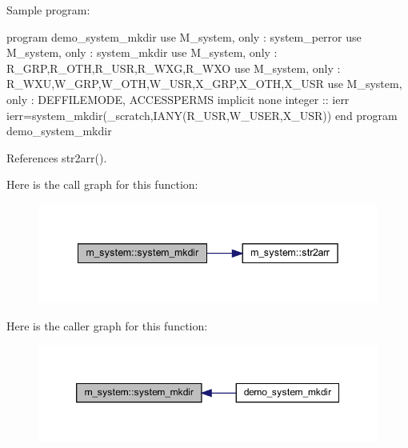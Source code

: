 Sample program\+:

program demo\+\_\+system\+\_\+mkdir use M\+\_\+system, only \+: system\+\_\+perror use M\+\_\+system, only \+: system\+\_\+mkdir use M\+\_\+system, only \+: R\+\_\+\+G\+RP,R\+\_\+\+O\+TH,R\+\_\+\+U\+SR,R\+\_\+\+W\+XG,R\+\_\+\+W\+XO use M\+\_\+system, only \+: R\+\_\+\+W\+XU,W\+\_\+\+G\+RP,W\+\_\+\+O\+TH,W\+\_\+\+U\+SR,X\+\_\+\+G\+RP,X\+\_\+\+O\+TH,X\+\_\+\+U\+SR use M\+\_\+system, only \+: D\+E\+F\+F\+I\+L\+E\+M\+O\+DE, A\+C\+C\+E\+S\+S\+P\+E\+R\+MS implicit none integer \+:\+: ierr ierr=system\+\_\+mkdir(\textquotesingle{}\+\_\+scratch\textquotesingle{},I\+A\+N\+Y(\+R\+\_\+\+U\+S\+R,\+W\+\_\+\+U\+S\+E\+R,\+X\+\_\+\+U\+S\+R)) end program demo\+\_\+system\+\_\+mkdir 

References str2arr().

Here is the call graph for this function\+:
\nopagebreak
\begin{figure}[H]
\begin{center}
\leavevmode
\includegraphics[width=342pt]{namespacem__system_a084d644c236d22af2cc75c6e48fd6e96_cgraph}
\end{center}
\end{figure}
Here is the caller graph for this function\+:
\nopagebreak
\begin{figure}[H]
\begin{center}
\leavevmode
\includegraphics[width=350pt]{namespacem__system_a084d644c236d22af2cc75c6e48fd6e96_icgraph}
\end{center}
\end{figure}
\mbox{\label{namespacem__system_aaa02751b5065c8fd046a56cbbd1a0e1e}} 
